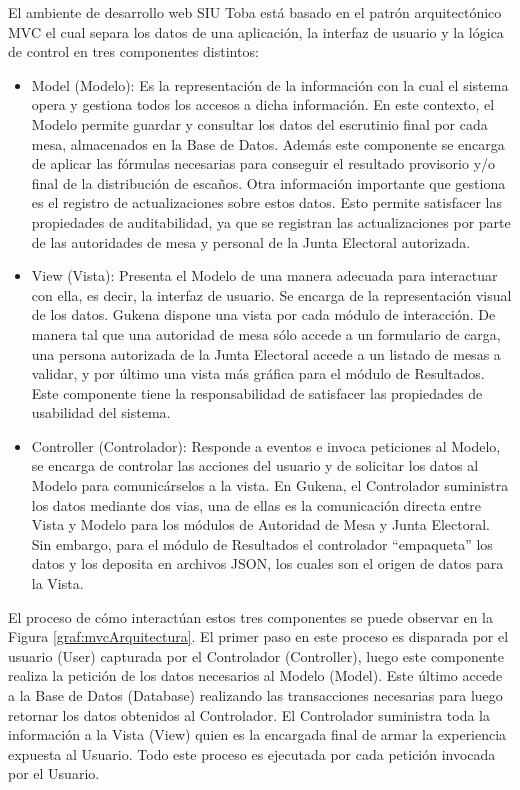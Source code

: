 El ambiente de desarrollo web SIU Toba está basado en el patrón arquitectónico MVC el cual separa los datos de una aplicación, la interfaz de usuario y la lógica de control en tres componentes distintos:
\begin{itemize}
    \item Model (Modelo): Es la representación de la información con la cual el sistema opera y gestiona todos los accesos a dicha información. En este contexto, el Modelo permite guardar y consultar los datos del escrutinio final por cada mesa, almacenados en la Base de Datos. Además este componente se encarga de aplicar las fórmulas necesarias para conseguir el resultado provisorio y/o final de la distribución de escaños. Otra información importante que gestiona es el registro de actualizaciones sobre estos datos. Esto permite satisfacer las propiedades de auditabilidad, ya que se registran las actualizaciones por parte de las autoridades de mesa y personal de la Junta Electoral autorizada.
    \item View (Vista): Presenta el Modelo de una manera adecuada para interactuar con ella, es decir, la interfaz de usuario. Se encarga de la representación visual de los datos. Gukena dispone una vista por cada módulo de interacción. De manera tal que una autoridad de mesa sólo accede a un formulario de carga, una persona autorizada de la Junta Electoral accede a un listado de mesas a validar, y por último una vista más gráfica para el módulo de Resultados. Este componente tiene la responsabilidad de satisfacer las propiedades de usabilidad del sistema.
    \item Controller (Controlador): Responde a eventos e invoca peticiones al Modelo, se encarga de controlar las acciones del usuario y de solicitar los datos al Modelo para comunicárselos a la vista. En Gukena, el Controlador suministra los datos mediante dos vias, una de ellas es la comunicación directa entre Vista y Modelo para los módulos de Autoridad de Mesa y Junta Electoral. Sin embargo, para el módulo de Resultados el controlador ``empaqueta'' los datos y los deposita en archivos JSON, los cuales son el origen de datos para la Vista.
\end{itemize}

El proceso de cómo interactúan estos tres componentes se puede observar en la Figura \ref{graf:mvcArquitectura}. El primer paso en este proceso es disparada por el usuario (User) capturada por el Controlador (Controller), luego este componente realiza la petición de los datos necesarios al Modelo (Model). Este último accede a la Base de Datos (Database) realizando las transacciones necesarias para luego retornar los datos obtenidos al Controlador. El Controlador suministra toda la información a la Vista (View) quien es la encargada final de armar la experiencia expuesta al Usuario. Todo este proceso es ejecutada por cada petición invocada por el Usuario.

